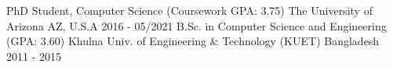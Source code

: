 

\begin{cventries}

  \cventry
    {PhD Student, Computer Science (Coursework GPA: 3.75)} %
    {The University of Arizona} %
    {AZ, U.S.A} %
    {2016 - 05/2021} %
    {}
    {}
  \vspace*{-2mm}
  \cventry
    {B.Sc. in Computer Science and Engineering (GPA: 3.60)} %
    {Khulna Univ. of Engineering \& Technology (KUET)} %
    {Bangladesh} %
    {2011 - 2015} %
    {}
    {}

\end{cventries}
